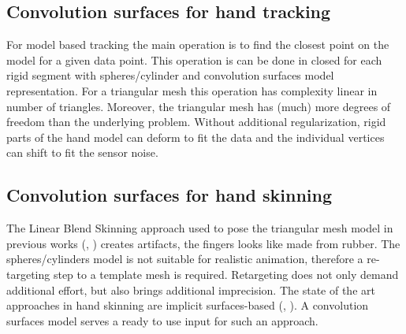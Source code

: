 \subsection{Convolution surfaces for hand tracking}
For model based tracking the main operation is to find the closest point on the model for a given data point. This operation is can be done in closed for each rigid segment with spheres/cylinder and convolution surfaces model representation. For a triangular mesh this operation has complexity linear in number of triangles. Moreover, the triangular mesh has (much) more degrees of freedom than the underlying problem. Without additional regularization, rigid parts of the hand model can deform to fit the data and the individual vertices can shift to fit the sensor noise.

\subsection{Convolution surfaces for hand skinning}
The Linear Blend Skinning approach used to pose the triangular mesh model in previous works (\cite{sharp2015accurate}, \cite{schroder2013analysis} ) creates artifacts, the fingers looks like made from rubber. The spheres/cylinders model is not suitable for realistic animation, therefore a re-targeting step to a template mesh is required. Retargeting does not only demand additional effort, but also brings additional imprecision. The state of the art approaches in hand skinning are implicit surfaces-based (\cite{vaillant2013implicit},  \cite{vaillant2014robust} ).  A convolution surfaces model serves a ready to use input for such an approach.








